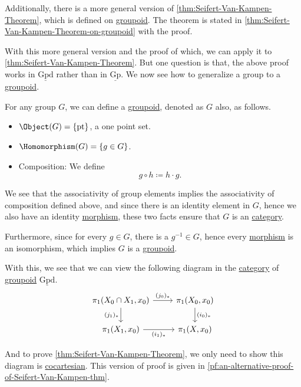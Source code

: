\hr
Additionally, there is a more general version of \autoref{thm:Seifert-Van-Kampen-Theorem}, which is defined on \hyperref[def:groupoid]{groupoid}. The theorem is
stated in \autoref{thm:Seifert-Van-Kampen-Theorem-on-groupoid} with the proof.

With this more general version and the proof of which, we can apply it to \autoref{thm:Seifert-Van-Kampen-Theorem}. But one question is that, the above proof
works in \(\underline{\mathrm{Gpd}}\) rather than in \(\underline{\mathrm{Gp}}\). We now see how to generalize a group to a \hyperref[def:groupoid]{groupoid}.

For any group \(G\), we can define a \hyperref[def:groupoid]{groupoid}, denoted as \(G\) also, as follows.
\begin{itemize}
	\item \(\Object (G) = \{\mathrm{pt} \}\), a one point set.
	\item \(\Homomorphism (G) = \{g\in G\}\).
	\item Composition: We define
	      \[
		      g\circ h \coloneqq h\cdot g.
	      \]
\end{itemize}
We see that the associativity of group elements implies the associativity of composition defined above, and since there is an identity element in \(G\), hence we also have
an identity \hyperref[def:morphism]{morphism}, these two facts ensure that \(G\) is an \hyperref[def:category]{category}.

Furthermore, since for every \(g\in G\), there is a \(g^{-1} \in G\), hence every \hyperref[def:morphism]{morphism} is an isomorphism, which implies \(G\) is a \hyperref[def:groupoid]{groupoid}.

With this, we see that we can view the following diagram in the \hyperref[def:category]{category} of \hyperref[def:groupoid]{groupoid} \(\underline{\mathrm{Gpd}}\).
\[
	\begin{tikzcd}
		{\pi_1(X_0\cap X_1, x_0)} & {\pi_1(X_0, x_0)} \\
		{\pi_1(X_1, x_0)} & {\pi_1(X, x_0)}
		\arrow["{(j_0)_\ast}", from=1-1, to=1-2]
		\arrow["{(i_0)_\ast}", from=1-2, to=2-2]
		\arrow["{(i_1)_\ast}"', from=2-1, to=2-2]
		\arrow["{(j_1)_\ast}"', from=1-1, to=2-1]
	\end{tikzcd}
\]

And to prove \autoref{thm:Seifert-Van-Kampen-Theorem}, we only need to show this diagram is \hyperref[def:cocartesian]{cocartesian}.
This version of proof is given in \autoref{pf:an-alternative-proof-of-Seifert-Van-Kampen-thm}.
